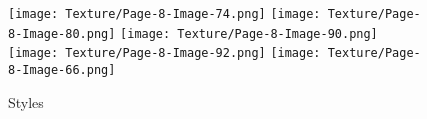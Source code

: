 \documentclass[runningheads]{llncs}
\begin{document}
\begin{figure*}[!htbp]
\centering
\small 
\begin{subfigure}[t]{0.15\textwidth}
	
	\texttt{[image: Texture/Page-8-Image-74.png]}
	\texttt{[image: Texture/Page-8-Image-80.png]}
	\texttt{[image: Texture/Page-8-Image-90.png]}
	\texttt{[image: Texture/Page-8-Image-92.png]}
    \texttt{[image: Texture/Page-8-Image-66.png]}
    \caption{Styles}
\end{subfigure}
\begin{subfigure}[t]{0.15\textwidth}
	

\end{subfigure}
\end{figure*}
\end{document}
